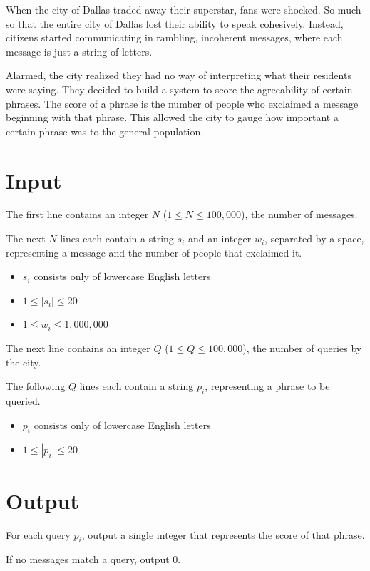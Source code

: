 
When the city of Dallas traded away their superstar, fans were shocked. So much so that the entire city of Dallas lost their ability to speak cohesively. Instead, citizens started communicating in rambling, incoherent messages, where each message is just a string of letters.

Alarmed, the city realized they had no way of interpreting what their residents were saying. They decided to build a system to score the agreeability of certain phrases. The score of a phrase is the number of people who exclaimed a message beginning with that phrase. This allowed the city to gauge how important a certain phrase was to the general population.

\section*{Input}

The first line contains an integer $N$ ($1 \le N \le 100,000$), the number of messages.

The next $N$ lines each contain a string $s_i$ and an integer $w_i$, separated by a space, representing a message and the number of people that exclaimed it.

\begin{itemize}
    \item $s_i$ consists only of lowercase English letters
    \item $1 \le |s_i| \le 20$
    \item $1 \le w_i \le 1,000,000$
\end{itemize}

The next line contains an integer $Q$ ($1 \le Q \le 100,000$), the number of queries by the city.

The following $Q$ lines each contain a string $p_i$, representing a phrase to be queried.

\begin{itemize}
    \item $p_i$ consists only of lowercase English letters
    \item $1 \le |p_i| \le 20$
\end{itemize}

\section*{Output}

For each query $p_i$, output a single integer that represents the score of that phrase.

If no messages match a query, output $0$.
